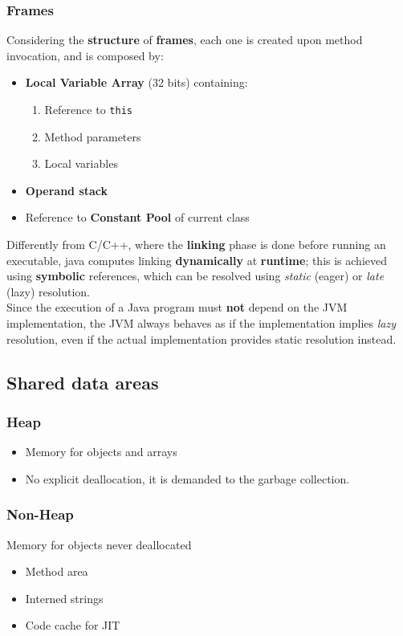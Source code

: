 \subsubsection{Frames}
{Considering the \textbf{structure} of \textbf{frames}, each one is created upon method invocation, and  is composed by:\ns
\begin{itemize}
    \item \textbf{Local Variable Array} (32 bits) containing:
    \begin{enumerate}
        \item Reference to \lstinline{this}
        \item Method parameters
        \item Local variables
    \end{enumerate}
    \item \textbf{Operand stack}
    \item Reference to \textbf{Constant Pool} of current class
\end{itemize}}

Differently from C/C++, where the \textbf{linking} phase is done before running an executable,
java computes linking \textbf{dynamically} at \textbf{runtime};
this is achieved using \textbf{symbolic} references, which can be resolved using \textit{static} (eager) or \textit{late} (lazy) resolution.\\
Since the execution of a Java program must \textbf{not} depend on the JVM implementation, the JVM always behaves as if the implementation implies \textit{lazy} resolution, 
even if the actual implementation provides static resolution instead.

\subsection{Shared data areas}
\subsubsection{Heap}
\begin{itemize}
    \item Memory for objects and arrays
    \item No explicit deallocation, it is demanded to the garbage collection.
\end{itemize}

\subsubsection{Non-Heap}
Memory for objects never deallocated
\begin{itemize}
    \item Method area
    \item Interned strings
    \item Code cache for JIT
\end{itemize}

